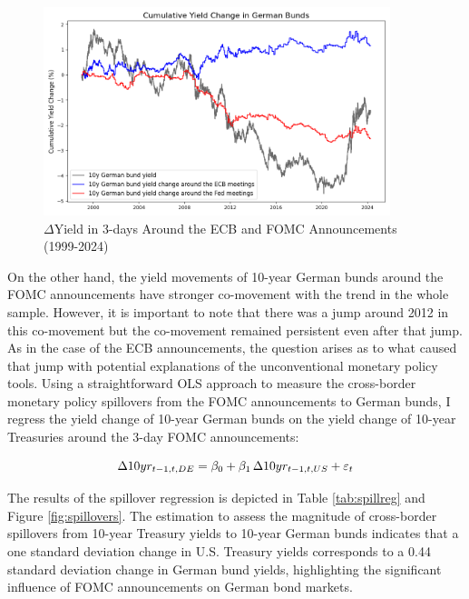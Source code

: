 \begin{figure}[!htbp]
    \centering
     \caption{$\Delta$Yield in 3-days Around the ECB and FOMC Announcements (1999-2024)}   \includegraphics[width=0.9\textwidth]{figures/1999_german_bunds_figure1a.png}

    \label{fig:german1999}
\end{figure}


On the other hand, the yield movements of 10-year German bunds around the FOMC announcements have stronger co-movement with the trend in the whole sample. However, it is important to note that there was a jump around 2012 in this co-movement but the co-movement remained persistent even after that jump. As in the case of the ECB announcements, the question arises as to what caused that jump with potential explanations of the unconventional monetary policy tools. Using a straightforward OLS approach to measure the cross-border monetary policy spillovers from the FOMC announcements to German bunds, I regress the yield change of 10-year German bunds on the yield change of 10-year Treasuries around the 3-day FOMC announcements:

\begin{equation} \notag
    \Delta 10yr_{t-1,t,DE}= \beta_0 + \beta_1\, \Delta 10yr_{t-1,t,US} + \varepsilon_t
\end{equation}
\vspace{-0.25cm}

The results of the spillover regression is depicted in Table \ref{tab:spillreg} and Figure \ref{fig:spillovers}. The estimation to assess the magnitude of cross-border spillovers from 10-year Treasury yields to 10-year German bunds indicates that a one standard deviation change in U.S. Treasury yields corresponds to a 0.44 standard deviation change in German bund yields, highlighting the significant influence of FOMC announcements on German bond markets.


